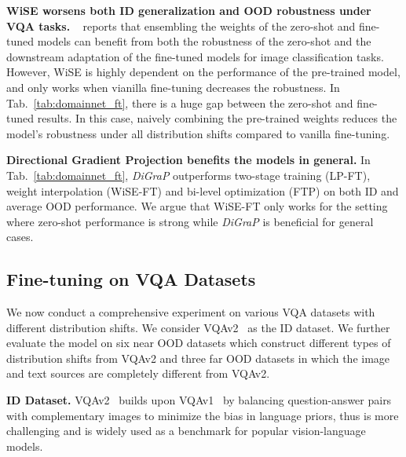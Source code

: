 \noindent \textbf{WiSE worsens both ID generalization and OOD robustness under VQA tasks.} ~\citet{wortsman_robust_2022} reports that ensembling the weights of the zero-shot and fine-tuned models can benefit from both the robustness of the zero-shot and the downstream adaptation of the fine-tuned models for image classification tasks. However, WiSE is highly dependent on the performance of the pre-trained model, and only works when vianilla fine-tuning decreases the robustness. In Tab.~\ref{tab:domainnet_ft}, there is a huge gap between the zero-shot and fine-tuned results. In this case, naively combining the pre-trained weights reduces the model's robustness under all distribution shifts compared to vanilla fine-tuning. 

\noindent \textbf{Directional Gradient Projection benefits the models in general.} In Tab.~\ref{tab:domainnet_ft}, \emph{DiGraP} outperforms two-stage training (LP-FT), weight interpolation (WiSE-FT) and bi-level optimization (FTP) on both ID and average OOD performance. We argue that WiSE-FT only works for the setting where zero-shot performance is strong while \emph{DiGraP} is beneficial for general cases. 


\subsection{Fine-tuning on VQA Datasets}
\label{sec:ft_vqa}

We now conduct a comprehensive experiment on various VQA datasets with different distribution shifts. We consider VQAv2~\citep{goyal_making_2017} as the ID dataset. We further evaluate the model on six near OOD datasets which construct different types of distribution shifts from VQAv2 and three far OOD datasets in which the image and text sources are completely different from VQAv2.



\textbf{ID Dataset.}
VQAv2~\citep{goyal_making_2017} builds upon VQAv1~\citep{agrawal2017cvqacompositionalsplitvisual} by balancing question-answer pairs with complementary images to minimize the bias in language priors, thus is more challenging and is widely used as a benchmark for popular vision-language models.


